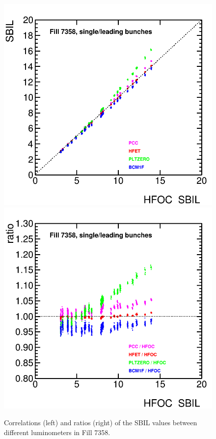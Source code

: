 \clearpage
\begin{figure}[t]
  \begin{center}
    \includegraphics[width=0.47\linewidth]{plots/sbilratios_singles/plot_linearity_det_correlation.png}
    \includegraphics[width=0.47\linewidth]{plots/sbilratios_singles/plot_linearity_det_correlation_ratio.png}
    \caption{
      Correlations (left) and ratios (right) of the SBIL values between different luminometers in Fill 7358.
    \label{fig:sbilratios_dets}
    }
  \end{center}
\end{figure}
